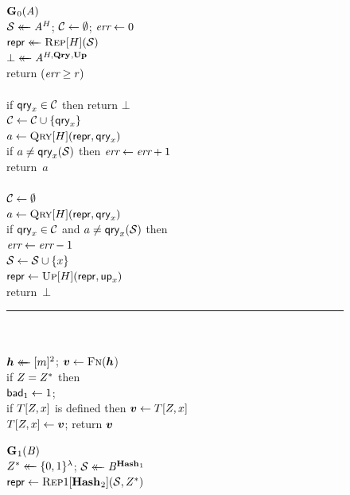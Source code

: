 \begin{figure}
  {
    \underline{$\mathbf{G}\hspace{0.5pt}_0(\mathit{A})$}\\[2pt]
      $\mathcal{S} \mathrel{\leftarrow\mkern-14mu\leftarrow} \mathit{A}^H$; $\mathcal{C} \gets \emptyset$; $\textit{err} \gets 0$\\
      $\mathsf{repr} \mathrel{\leftarrow\mkern-14mu\leftarrow} \textsc{Rep}[H](\mathcal{S})$\\
      $\bot \mathrel{\leftarrow\mkern-14mu\leftarrow} \mathit{A}^{H,\mathbf{Qry}\hspace{0.5pt},\mathbf{Up}\hspace{0.5pt}}$\\
      return $(\textit{err} \geq r)$
    \\[6pt]
    \\[2pt]
      if $\mathsf{qry}_x \in \mathcal{C}$ then return $\bot$\\
      $\mathcal{C} \gets \mathcal{C} \cup \{\mathsf{qry}_x\}$\\
      $a \gets \textsc{Qry}[H](\mathsf{repr}, \mathsf{qry}_x)$\\
      if $a \neq \mathsf{qry}_x(\mathcal{S})$ then $\textit{err} \gets \textit{err} + 1$\\
      return~$a$
    \\[6pt]
    \\[2pt]
      $\mathcal{C} \gets \emptyset$\\
      $a \gets \textsc{Qry}[H](\mathsf{repr}, \mathsf{qry}_x)$\\
      if $\mathsf{qry}_x \in \mathcal{C}$ and $a \neq \mathsf{qry}_x(\mathcal{S})$ then\\
      \tab $\textit{err} \gets \textit{err}-1$\\
      $\mathcal{S} \gets \mathcal{S} \cup \{x\}$\\
      $\mathsf{repr} \gets \textsc{Up}[H](\mathsf{repr},\mathsf{up}_x)$\\
      return~$\bot$
    \\[4pt]
    \hspace*{-4pt}\rule{1.043\textwidth}{.4pt}
    \\[5pt]
     \hfill{}\hspace*{3pt}\\
      $\hh \getsr [m]^2$; $\vv \gets \fff(\hh$)\\
      if $Z = Z^*$ then\\
      \tab $\mathsf{bad}_1 \gets 1$; \\
      if $T[Z,x]$ is defined then $\vv \gets T[\salt,x]$\\
      $T[\salt,x] \gets \vv$;
      return $\vv$
  }
  {
    \underline{$\mathbf{G}\hspace{0.5pt}_1(\mathit{B})$}\\[2pt]
      $Z^* \mathrel{\leftarrow\mkern-14mu\leftarrow} \{0,1\}^\lambda$;
      $\mathcal{S} \mathrel{\leftarrow\mkern-14mu\leftarrow} \mathit{B}^{\mathbf{Hash}\hspace{0.5pt}_1}$\\
      $\mathsf{repr} \gets \textsc{Rep}1[\mathbf{Hash}\hspace{0.5pt}_2](\mathcal{S}, Z^*)$\\
}
\end{figure}
